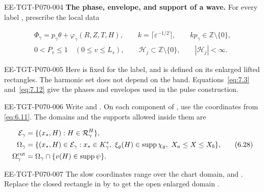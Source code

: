 \begin{EESegment}{EE-TGT-P070-004}
\textbf{The phase, envelope, and support of a wave.} For every label , prescribe the local data
\end{EESegment}
\begin{equation}
  \begin{gathered}
    \Phi_\gamma=p_\gamma\theta+\varphi_\gamma(R,Z,T,H),
    \qquad k=\lceil\varepsilon^{-1/2}\rceil,
    \qquad kp_\gamma\in\mathbb Z\setminus\{0\},\\
    0<P_v\le1\quad(0\le v\le L_s),
    \qquad \mathscr H_j\subset\mathbb Z\setminus\{0\},
    \qquad |\mathscr H_j|<\infty.
  \end{gathered}
  \tag{6.27}\label{eq:6.27}
\end{equation}
\begin{EESegment}{EE-TGT-P070-005}
Here  is fixed for the label, and  is defined on its enlarged lifted rectangles. The harmonic set  does not depend on the band. Equations~\eqref{eq:7.3} and~\eqref{eq:7.12} give the phases and envelopes used in the pulse construction.
\end{EESegment}

\begin{EESegment}{EE-TGT-P070-006}
Write  and . On each component of , use the coordinates  from \eqref{eq:6.11}. The domains and the supports allowed inside them are
\end{EESegment}
\begin{equation}
  \begin{aligned}
    \mathcal E_\gamma
      &=\{(x_*,H):H\in\mathcal R_\gamma^H\},\\
    \Omega_\gamma
      &=\{(x_*,H)\in\mathcal E_\gamma:x_*\in K_\gamma^*,
        \ \xi_g(H)\in\operatorname{supp}\chi_g,\ X_a\le X\le X_b\},\\
    \Omega_\gamma^{\mathrm{cut}}
      &=\Omega_\gamma\cap\{v(H)\in\operatorname{supp}\psi\}.
  \end{aligned}
  \tag{6.28}\label{eq:6.28}
\end{equation}
\begin{EESegment}{EE-TGT-P070-007}
The slow coordinates range over the chart domain, and . Replace the closed rectangle in  by  to get the open enlarged domain .
\end{EESegment}

